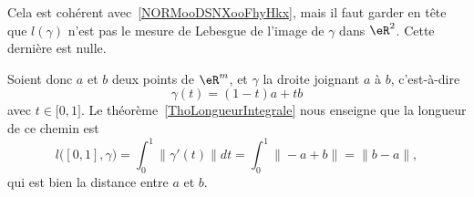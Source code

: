 \begin{remark}  \label{RemLongIntUn}
    Cela est cohérent avec~\ref{NORMooDSNXooFhyHkx}, mais il faut garder en tête que \( l(\gamma)\) n'est pas le mesure de Lebesgue de l'image de \( \gamma\) dans \( \eR^2\). Cette dernière est nulle.
\end{remark}

\begin{example}
Soient donc $a$ et $b$ deux points de $\eR^m$, et $\gamma$ la droite joignant $a$ à $b$, c'est-à-dire
\begin{equation}
    \gamma(t)=(1-t)a+tb
\end{equation}
avec $t\in\mathopen[ 0 , 1 \mathclose]$. Le théorème~\ref{ThoLongueurIntegrale} nous enseigne que la longueur de ce chemin est
\begin{equation}
    l\big( [0,1],\gamma \big)=\int_0^1\| \gamma'(t) \|dt=\int_0^1\| -a+b \|=\| b-a \|,
\end{equation}
qui est bien la distance entre $a$ et $b$.
\end{example}

